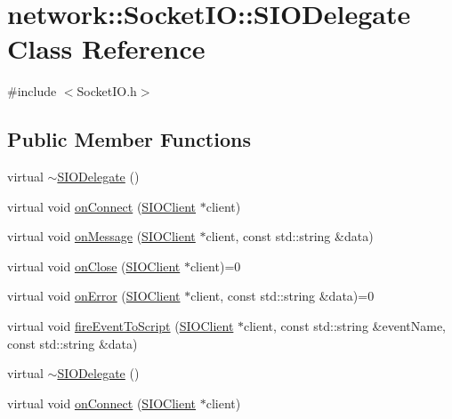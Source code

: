 \hypertarget{classnetwork_1_1SocketIO_1_1SIODelegate}{}\section{network\+:\+:Socket\+IO\+:\+:S\+I\+O\+Delegate Class Reference}
\label{classnetwork_1_1SocketIO_1_1SIODelegate}


{\ttfamily \#include $<$Socket\+I\+O.\+h$>$}

\subsection*{Public Member Functions}
\begin{DoxyCompactItemize}
\item 
virtual \hyperlink{classnetwork_1_1SocketIO_1_1SIODelegate_ab487c39e21b09a5538d17a9ac47cfcc0}{$\sim$\+S\+I\+O\+Delegate} ()
\item 
virtual void \hyperlink{classnetwork_1_1SocketIO_1_1SIODelegate_a98b6cc717fbfb99d96216ddf5824b2ab}{on\+Connect} (\hyperlink{classnetwork_1_1SIOClient}{S\+I\+O\+Client} $\ast$client)
\item 
virtual void \hyperlink{classnetwork_1_1SocketIO_1_1SIODelegate_aa498be5838a65bdb5a42707de71a5d2a}{on\+Message} (\hyperlink{classnetwork_1_1SIOClient}{S\+I\+O\+Client} $\ast$client, const std\+::string \&data)
\item 
virtual void \hyperlink{classnetwork_1_1SocketIO_1_1SIODelegate_ac70f5e19ee755ac6dbc608018e2176f4}{on\+Close} (\hyperlink{classnetwork_1_1SIOClient}{S\+I\+O\+Client} $\ast$client)=0
\item 
virtual void \hyperlink{classnetwork_1_1SocketIO_1_1SIODelegate_a906cad51ad2efe52ffe41047239c6f5d}{on\+Error} (\hyperlink{classnetwork_1_1SIOClient}{S\+I\+O\+Client} $\ast$client, const std\+::string \&data)=0
\item 
virtual void \hyperlink{classnetwork_1_1SocketIO_1_1SIODelegate_abbe454ccb39be64c6904658a3afdf9ca}{fire\+Event\+To\+Script} (\hyperlink{classnetwork_1_1SIOClient}{S\+I\+O\+Client} $\ast$client, const std\+::string \&event\+Name, const std\+::string \&data)
\item 
virtual \hyperlink{classnetwork_1_1SocketIO_1_1SIODelegate_ab487c39e21b09a5538d17a9ac47cfcc0}{$\sim$\+S\+I\+O\+Delegate} ()
\item 
virtual void \hyperlink{classnetwork_1_1SocketIO_1_1SIODelegate_a98b6cc717fbfb99d96216ddf5824b2ab}{on\+Connect} (\hyperlink{classnetwork_1_1SIOClient}{S\+I\+O\+Client} $\ast$client)

\end{DoxyCompactItemize}
